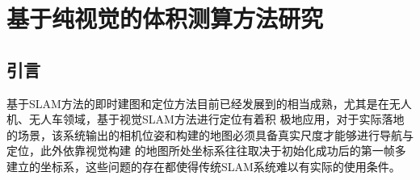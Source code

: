 \chapter{基于纯视觉的体积测算方法研究}
\label{cha:chap3}
\section{引言}
\label{sec:3.1}
基于SLAM方法的即时建图和定位方法目前已经发展到的相当成熟，尤其是在无人机、无人车领域，基于视觉SLAM方法进行定位有着积
极地应用，对于实际落地的场景，该系统输出的相机位姿和构建的地图必须具备真实尺度才能够进行导航与定位，此外依靠视觉构建
的地图所处坐标系往往取决于初始化成功后的第一帧多建立的坐标系，这些问题的存在都使得传统SLAM系统难以有实际的使用条件。
